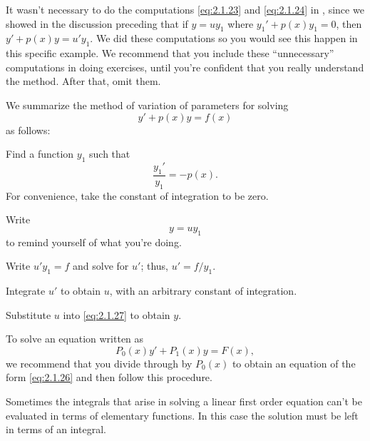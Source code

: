 \begin{remark*}
It wasn't necessary to do the computations
\eqref{eq:2.1.23} and \eqref{eq:2.1.24} in
, since we showed in the discussion preceding
 that if $y=uy_1$ where $y_1'+p(x)y_1=0$,
then
$y'+p(x)y=u'y_1$. We did these computations so you would see this
happen in this specific example. We recommend that you include these
``unnecessary'' computations in doing exercises, until you're confident
that you really understand the method. After that, omit them.
\end{remark*}

\medskip


We summarize the method  of variation of parameters for solving
\begin{equation} \label{eq:2.1.26}
y'+p(x)y=f(x)
\end{equation}
as follows:

\medskip
\begin{alist}[before={\color{blue}}]
\item %
Find a function $y_1$  such that
\[
\frac{y_1'}{y_1}=-p(x).
\]
For convenience, take the constant of integration to be zero.
\item %
Write
\begin{equation} \label{eq:2.1.27}
y=uy_1
\end{equation}
to remind yourself of what you're doing.
\item %
Write $u'y_1=f$ and solve for $u'$;   thus, $u'=f/y_1$.
\item %
Integrate $u'$ to obtain $u$, with an arbitrary constant of
integration.
\item %
Substitute $u$ into \eqref{eq:2.1.27}  to obtain $y$.
\end{alist}

\medskip
To solve an equation written as
\[
P_0(x)y'+P_1(x)y=F(x),
\]
we recommend that you divide through by $P_0(x)$ to obtain an equation
of the form  \eqref{eq:2.1.26}
and then follow this   procedure.


Sometimes the integrals that arise in solving a linear first order
equation can't be evaluated in terms of elementary functions. In this
case the solution must be left in terms of an integral.

